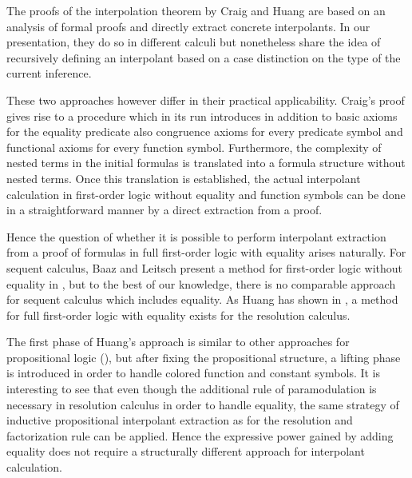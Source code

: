 
The proofs of the interpolation theorem by Craig and Huang are based on an analysis of formal proofs and directly extract concrete interpolants.
In our presentation, they do so in different calculi but nonetheless share the idea of recursively defining an interpolant based on a case distinction on the type of the current inference.

These two approaches however differ in their practical applicability. 
Craig's proof gives rise to a procedure which in its run introduces in addition to basic axioms for the equality predicate also congruence axioms for every predicate symbol and functional axioms for every function symbol.
Furthermore, the complexity of nested terms in the initial formulas is translated into a formula structure without nested terms.
Once this translation is established, the actual interpolant calculation in first-order logic without equality and function symbols can be done in a straightforward manner by a direct extraction from a proof.

Hence the question of whether it is possible to perform interpolant extraction from a proof of formulas in full first-order logic with equality arises naturally.
For sequent calculus, Baaz and Leitsch present a method for first-order logic without equality in \cite{baaz2011methods}, but to the best of our knowledge, there is no comparable approach for sequent calculus which includes equality.
As Huang has shown in \cite{Huang95}, a method for full first-order logic with equality exists for the resolution calculus.

The first phase of Huang's approach is similar to other approaches for propositional logic (\cite{krajivcek1997interpolation,Pudlak97,McMillan03}),
but after fixing the propositional structure, a lifting phase is introduced in order to handle colored function and constant symbols.
It is interesting to see that even though the additional rule of paramodulation is necessary in resolution calculus in order to handle equality,
the same strategy of inductive propositional interpolant extraction as for the resolution and factorization rule can be applied.
Hence the expressive power gained by adding equality does not require a structurally different approach for interpolant calculation.

